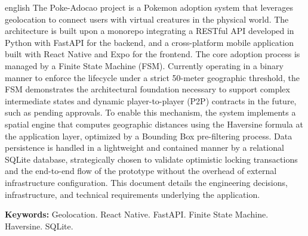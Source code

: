 \documentclass[
    12pt,
    openright,
    oneside,
    a4paper,
    english,
    brazil
    ]{abntex2}
\begin{document}
\begin{resumo}[Abstract]
\begin{otherlanguage*}{english}
The Poke-Adocao project is a Pokemon adoption system that leverages geolocation to connect users with virtual creatures in the physical world. The architecture is built upon a monorepo integrating a RESTful API developed in Python with FastAPI for the backend, and a cross-platform mobile application built with React Native and Expo for the frontend. The core adoption process is managed by a Finite State Machine (FSM). Currently operating in a binary manner to enforce the lifecycle under a strict 50-meter geographic threshold, the FSM demonstrates the architectural foundation necessary to support complex intermediate states and dynamic player-to-player (P2P) contracts in the future, such as pending approvals. To enable this mechanism, the system implements a spatial engine that computes geographic distances using the Haversine formula at the application layer, optimized by a Bounding Box pre-filtering process. Data persistence is handled in a lightweight and contained manner by a relational SQLite database, strategically chosen to validate optimistic locking transactions and the end-to-end flow of the prototype without the overhead of external infrastructure configuration. This document details the engineering decisions, infrastructure, and technical requirements underlying the application.

\vspace{\onelineskip}
\noindent
\textbf{Keywords:} Geolocation. React Native. FastAPI. Finite State Machine. Haversine. SQLite.
\end{otherlanguage*}
\end{resumo}


\listoffigures*
\cleardoublepage


\listofquadros*
\cleardoublepage

\tableofcontents
\cleardoublepage

\textual
\end{document}
